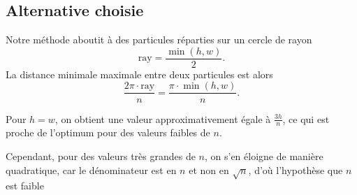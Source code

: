 \documentclass{article}
\begin{document}
\subsection*{Alternative choisie}
Notre méthode aboutit à des particules réparties sur un cercle de rayon
\[
\text{ray} = \frac{\min(h,w)}{2}.
\]
La distance minimale maximale entre deux particules est alors
\[
\frac{2\pi \cdot \text{ray}}{n} = \frac{\pi \cdot \min(h,w)}{n}.
\]

Pour $h = w$, on obtient une valeur approximativement égale à $\frac{3h}{n}$,
ce qui est proche de l’optimum pour des valeurs faibles de $n$.

Cependant, pour des valeurs très grandes de $n$, on s’en éloigne de manière quadratique,
car le dénominateur est en $n$ et non en $\sqrt{n}$, d’où l’hypothèse que $n$ est faible
\end{document}

